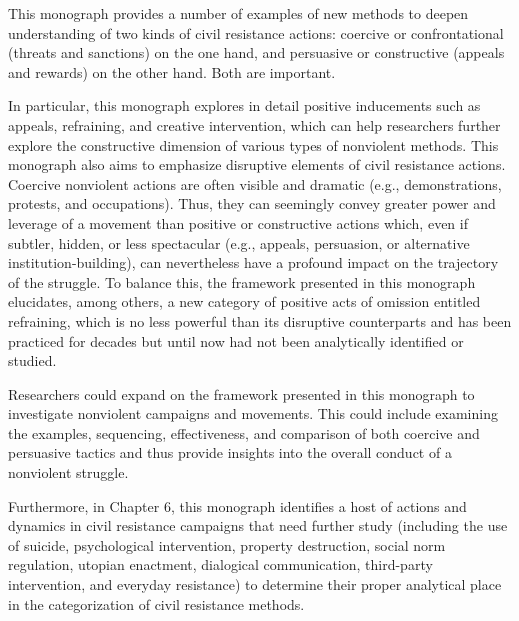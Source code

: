 \documentclass[twoside,a4paper,12pt,fleqn,openany]{extbook}
\begin{document}
This monograph provides a number of examples of new methods to deepen understanding of two kinds of civil resistance actions: coercive or confrontational (threats and sanctions) on the one hand, and persuasive or constructive (appeals and rewards) on the other hand. Both are important.

In particular, this monograph explores in detail positive inducements such as appeals, refraining, and creative intervention, which can help researchers further explore the constructive dimension of various types of nonviolent methods. This monograph also aims to emphasize disruptive elements of civil resistance actions. Coercive nonviolent actions are often visible and dramatic (e.g., demonstrations, protests, and occupations). Thus, they can seemingly convey greater power and leverage of a movement than positive or constructive actions which, even if subtler, hidden, or less spectacular (e.g., appeals, persuasion, or alternative institution-building), can nevertheless have a profound impact on the trajectory of the struggle. To balance this, the framework presented in this monograph elucidates, among others, a new category of positive acts of omission entitled refraining, which is no less powerful than its disruptive counterparts and has been practiced for decades but until now had not been analytically identified or studied.

Researchers could expand on the framework presented in this monograph to investigate nonviolent campaigns and movements. This could include examining the examples, sequencing, effectiveness, and comparison of both coercive and persuasive tactics and thus provide insights into the overall conduct of a nonviolent struggle.

Furthermore, in Chapter 6, this monograph identifies a host of actions and dynamics in civil resistance campaigns that need further study (including the use of suicide, psychological intervention, property destruction, social norm regulation, utopian enactment, dialogical communication, third-party intervention, and everyday resistance) to determine their proper analytical place in the categorization of civil resistance methods.
\end{document}
